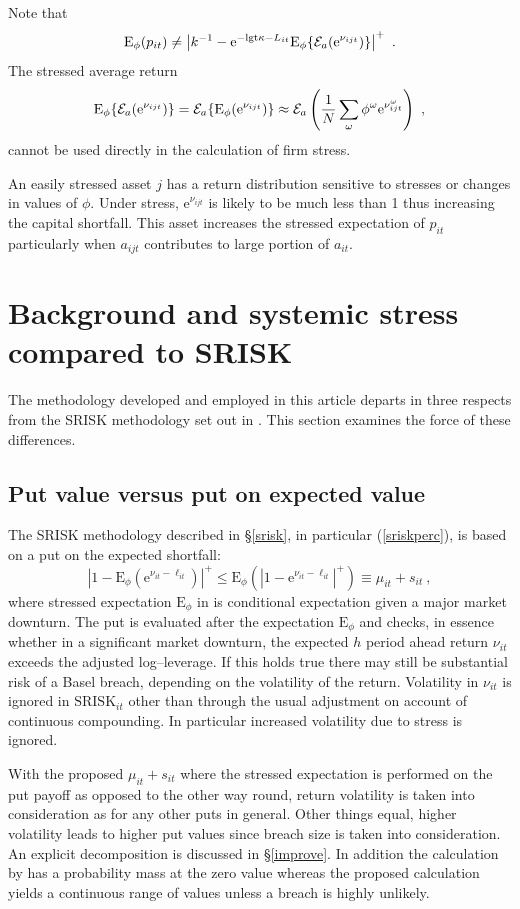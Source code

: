 \documentclass[authoryear]{elsarticle}
\newcommand{\logit}{\mathrm{lgt}}
\newcommand{\E}{\mathrm{E}}
\newcommand{\e}{\mathrm{e}}
\renewcommand{\o}{\omega}
\newcommand{\Ex}{{\cal E}}
\newcommand{\Es}{\E_\phi}
\newcommand{\eref}[1]{(\ref{#1})}
\newcommand{\sref}[1]{\S\ref{#1}}
\newcommand{\be}[1]{\begin{equation}\label{#1}}
\newcommand{\ee}{\end{equation}}
\begin{document}
Note that
$$
\Es(p_{it}) \ne \left|k^{-1}-\e^{-\logit\kappa-L_{it}}\Es\{\Ex_a(\e^{\nu_{ijt}})\}\right|^+\ .
$$
The stressed average return
$$
\Es\{\Ex_a(\e^{\nu_{ijt}})\} = \Ex_a\{\Es(\e^{\nu_{ijt}})\} \approx \Ex_a\left( \frac{1}{N}\sum_\o\phi^\o\e^{\nu_{ijt}^\o}\right)\ ,
$$
cannot be used directly in the calculation of firm stress.

An easily stressed asset $j$  has a return distribution sensitive to stresses or changes in values of $\phi$. Under stress, $\e^{\nu_{ijt}}$ is likely to be much less than 1 thus increasing the capital shortfall. This asset increases the stressed expectation of $p_{it}$ particularly when $a_{ijt}$ contributes to large portion of $a_{it}$.







\section{Background and systemic stress  compared to SRISK}\label{comparison}

The methodology developed and employed in this article departs in three respects from the SRISK methodology set out in \cite{brownlees2015}.  This section examines the force of these differences.

\subsection{Put value versus put on expected value}

The SRISK methodology described in \sref{srisk}, in particular \eref{sriskperc}, is based on a put on the expected shortfall:
\be{prisk}
 |1-\E_\phi(\e^{\nu_{it}-\ell_{it}})|^+\le \Es(|1-\e^{\nu_{it}-\ell_{it}}|^+) \equiv \mu_{it}+s_{it}\ ,
\ee
where stressed expectation $\Es$ in \cite{brownlees2015} is conditional expectation given a major market downturn.  The   put is evaluated after the expectation $\Es$ and checks, in essence whether in a significant market downturn, the expected $h$ period ahead return $\nu_{it}$ exceeds the adjusted   log--leverage.  If this holds true there may still be substantial risk of a Basel breach, depending on the volatility of the return.   Volatility in $\nu_{it}$ is ignored in  $\mathrm{SRISK}_{it}$  other than through the usual adjustment on account of continuous compounding.  In particular increased volatility due to stress is ignored.

With the proposed $\mu_{it}+s_{it}$ where the stressed expectation is performed on the put payoff as opposed to the other way round, return volatility is taken into consideration as for any other puts in general. Other things equal, higher volatility leads to higher put values since breach size is taken into consideration. An explicit decomposition is discussed in \sref{improve}. In addition the calculation by \cite{brownlees2015} has a probability mass at the zero value whereas the proposed calculation yields a continuous range of values unless a breach is highly unlikely.
\end{document}
